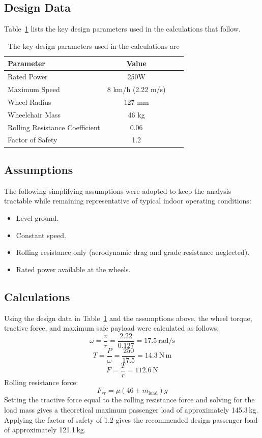 \subsection*{Design Data}

Table~\ref{tab:design-data} lists the key design parameters used in the calculations that follow.

\begin{table}[H]
\centering
\caption{The key design parameters used in the calculations are}
\label{tab:design-data}
\begin{tabular}{l c c c}
\hline
Parameter& Value  \\
\hline
Rated Power & 250W  \\
Maximum Speed & 8 km/h (2.22 m/s)\\
Wheel Radius &127 mm \\
Wheelchair Mass& 46 kg  \\
Rolling Resistance Coefficient & 0.06 \\
Factor of Safety & 1.2 \\
\hline
\end{tabular}
\end{table}


\subsection*{Assumptions}
The following simplifying assumptions were adopted to keep the analysis tractable while remaining representative of typical indoor operating conditions:
\begin{itemize}
\item Level ground.
\item Constant speed.
\item Rolling resistance only (aerodynamic drag and grade resistance neglected).
\item Rated power available at the wheels.
\end{itemize}

\subsection*{Calculations}
Using the design data in Table~\ref{tab:design-data} and the assumptions above, the wheel torque, tractive force, and maximum safe payload were calculated as follows.
\[
\omega = \frac{v}{r} = \frac{2.22}{0.127} = 17.5\ \mathrm{rad/s}
\]
\[
T = \frac{P}{\omega} = \frac{250}{17.5} = 14.3\ \mathrm{N\,m}
\]
\[
F = \frac{T}{r} = 112.6\ \mathrm{N}
\]
Rolling resistance force:
\[
F_{rr} = \mu (46 + m_{\text{load}}) g
\]
Setting the tractive force equal to the rolling resistance force and solving for the load mass gives a theoretical maximum passenger load of approximately 145.3\,kg. Applying the factor of safety of 1.2 gives the recommended design passenger load of approximately 121.1\,kg.


